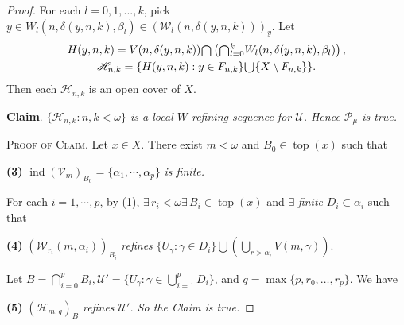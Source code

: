 \documentclass[jisng7iii.tex]{subfiles}
\begin{document}
\begin{proof}
\noindent For each $l = 0, 1, ..., k$, pick 
$y\in W_l(n, \delta(y, n, k), \beta_l) \in (\mathscr{W}_l(n, \delta(y, n, k)))_y$.
Let 
\begin{gather*}
H(y, n, k) = V(n, \delta(y, n, k))\raisebox{-2pt}{\scalebox{1.5}{$\cap$}} \left(
	\raisebox{-2pt}{\scalebox{1.5}{$\cap$}}_{l=0}^k W_l(n, \delta(y, n, k), \beta_l)\right),\\
\mathscr{H}_{n,k}= \{H(y, n, k): y\in F_{n, k} \}\raisebox{-2pt}{\scalebox{1.5}{$\cup$}} \{X\setminus F_{n,k}\}\}.
\end{gather*}
Then each $\mathscr{H}_{n,k}$ is an open cover of $X$.

\textbf{Claim}.
 \textit{$\{\mathscr{H}_{n,k}: n,k<\omega\}$ is a local $W$-refining sequence for 
 $\mathscr{U}$. Hence $\mathcal{P}_\mu$ is true.}

\noindent\textsc{Proof of Claim}.
 Let $x \in X$. There exist $m< \omega$ and $B_0\in \operatorname{top}(x)$ 
 such that 
 
 \textbf{(3)} $\operatorname{ind}(\mathscr{V}_m)_{B_0}= \{\alpha_1,\cdots, \alpha_p\}$ \textit{is finite.}

\noindent For each $i = 1, \cdots, p$, by (1), 
$\exists \, r_i < \omega \exists \, B_i \in \operatorname{top}(x)$ and 
$\exists $ \textit{ finite } $D_i \subset \alpha_i$ 
such that 

\textbf{(4)}  $(\mathscr{W}_{r_i}(m, \alpha_i))_{B_i}$ \textit{refines}
$\{U_\gamma: \gamma \in D_i\} \bigcup(\bigcup_{r > \alpha_i}V(m, \gamma))$. 

\noindent Let
$B = \bigcap_{i=0}^{p} B_i, \mathscr{U}' = \{U_\gamma: \gamma\in \bigcup_{i=1}^p D_i\}$,
 and $q = \max\{p, r_0, \dots, r_p\}$. We have

\textbf{(5)} \textit{$(\mathscr{H}_{m,q})_B$ refines $\mathscr{U}'$. So  the Claim is true.}


\end{proof}
\end{document}
